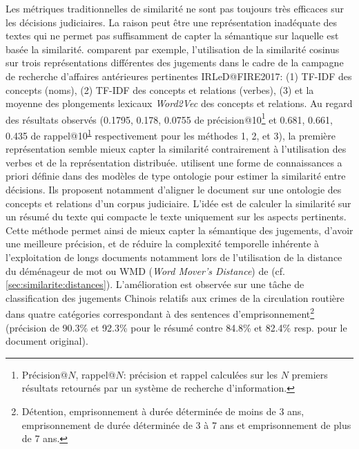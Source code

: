 Les métriques traditionnelles de similarité ne sont pas toujours très efficaces sur les décisions judiciaires. La raison peut être une représentation inadéquate des textes qui ne permet pas suffisamment de capter
la sémantique sur laquelle est basée la similarité. \citet{thenmozhi2017legalprecedretriev} comparent par exemple, l'utilisation de la similarité cosinus sur trois représentations différentes des jugements dans le cadre de la campagne de recherche d'affaires antérieures pertinentes  IRLeD@FIRE2017\citep{mandal2017IRLeD@FIRE2017}: (1) TF-IDF des concepts (noms), (2) TF-IDF des concepts et relations (verbes), (3) et la moyenne des plongements lexicaux \textit{Word2Vec} \citep{lemikolov2014word2vec} des concepts et relations. Au regard des résultats observés (0.1795, 0.178, 0.0755 de précision@10\footnote{\label{footnote:literature:PR_at_N} Précision@$N$, rappel@$N$: précision et rappel calculées sur les $N$ premiers résultats retournés par un système de recherche d'information.} et 0.681, 0.661, 0.435 de rappel@10\textsuperscript{\ref{footnote:literature:PR_at_N}} respectivement pour les méthodes 1, 2, et 3), la première représentation semble mieux capter la similarité contrairement à l'utilisation des verbes et de la représentation distribuée.  %
 \citet{ma2018wmdchinesecase} utilisent une forme de connaissances a priori définie dans des modèles de type ontologie pour estimer la similarité entre décisions. Ils proposent notamment d'aligner le document sur une ontologie des concepts et relations d'un corpus judiciaire. L'idée est de calculer la similarité sur un résumé du texte qui compacte le texte uniquement sur les aspects pertinents. Cette méthode permet ainsi de mieux capter la sémantique des jugements, d'avoir une meilleure précision, et de réduire la complexité temporelle inhérente à l'exploitation de longs documents notamment lors de l'utilisation de la \og distance du déménageur de mot \fg{} ou WMD (\textit{Word Mover's Distance}) de \citet{kusner2015wordmoverdist} (cf. \ref{sec:similarite:distances}). L'amélioration est observée sur une tâche de classification des jugements Chinois relatifs aux crimes de la circulation routière dans quatre catégories correspondant à des sentences d'emprisonnement\footnote{Détention, emprisonnement à durée déterminée de moins de 3 ans, emprisonnement de durée déterminée de 3 à 7 ans et emprisonnement de plus de 7 ans.} (précision de 90.3\% et 92.3\% pour le résumé contre 84.8\% et 82.4\% resp. pour le document original). 

